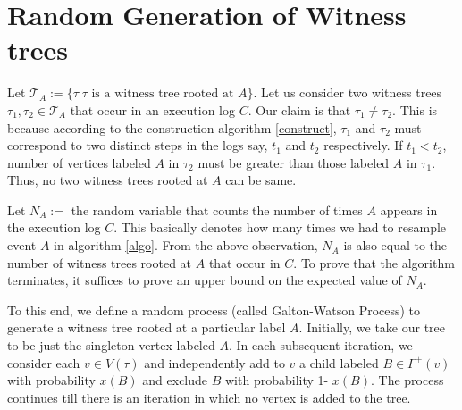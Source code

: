 \section{Random Generation of Witness trees}
Let $\mathcal{T}_A := \{\tau|\tau \text{ is a witness tree rooted at }A\} $. Let us consider two witness trees $\tau_1,\tau_2\in \mathcal{T}_A$ that occur in an execution log $C$. Our claim is that $\tau_1\neq\tau_2$. This is because according to the construction algorithm \ref{construct}, $\tau_1$ and $\tau_2$ must correspond to two distinct steps in the logs say, $t_1$ and  $t_2$ respectively. If $t_1 < t_2$, number of vertices labeled $A$ in $\tau_2$ must be greater than those labeled $A$ in $\tau_1$. Thus, no two witness trees rooted at $A$ can be same.

Let $N_A:=$ the random variable that counts the number of times $A$ appears in the execution log $C$. This basically denotes how many times we had to resample event $A$ in algorithm \ref{algo}. From the above observation, $N_A$ is also equal to the number of witness trees rooted at $A$ that occur in $C$. To prove that the algorithm terminates, it suffices to prove an upper bound on the expected value of $N_A$.

To this end, we define a random process (called Galton-Watson Process) to generate a witness tree rooted at a particular label $A$. Initially, we take our tree to be just the singleton vertex labeled $A$. In each subsequent iteration, we consider each $v\in V(\tau)$ and independently add to $v$ a child labeled $B \in\Gamma^+(v) $ with probability $x(B)$ and exclude $B$ with probability 1- $x(B) $. The process continues till there is an iteration in which no vertex is added to the tree.

